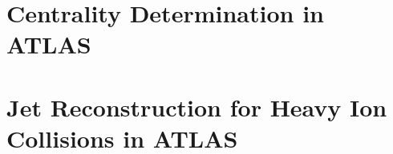 

\section{Centrality Determination in ATLAS}


\section{Jet Reconstruction for Heavy Ion Collisions in ATLAS}

